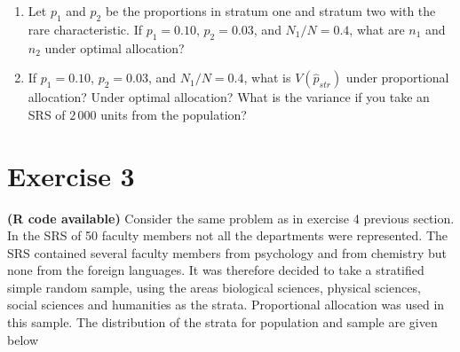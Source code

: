\documentclass[12pt]{article}
\begin{document}
\begin{enumerate}
\item  Let $p_1$ and $p_2$ be the proportions in stratum one and stratum two with the rare characteristic.
If $p_1=0.10$, $p_2=0.03$, and $N_1/N = 0.4$, what are $n_1$ and $n_2$ under optimal allocation?\\
\item If $p_1=0.10$, $p_2=0.03$, and $N_1/N = 0.4$, what is $V(\hat{p}_{str})$ under proportional allocation? Under optimal allocation? What is the variance if you take an SRS of $2\,000$ units from the population? \\
\end{enumerate}

\section*{Exercise 3}
\textbf{\color{ForestGreen}(R code available)} Consider the same problem as in exercise 4 previous section. In the SRS of 50 faculty members not all the departments were represented. The SRS contained several faculty members from psychology and from chemistry but none from the foreign languages. It was therefore decided to take a stratified simple random sample, using the areas biological sciences, physical sciences, social sciences and humanities as the strata. Proportional allocation was used in this sample. The distribution of the strata for population and sample are given below
	
\end{document}
